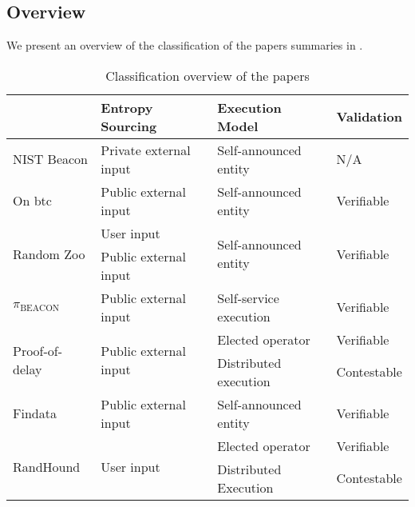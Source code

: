 \subsection{Overview}
\label{sub:overview}
We present an overview of the classification of the papers summaries in .

\begin{table}[htbp]
    \centering
    \begin{tabularx}{\textwidth}{Xlll}
                               & \textbf{Entropy Sourcing}              & \textbf{Execution Model}               & \textbf{Validation}         \\\midrule
NIST Beacon                    & Private external input                 & Self-announced entity                  & N/A                         \\[1.5em]
On btc                         & Public external input                  & Self-announced entity                  & Verifiable                  \\[1.5em]
\multirow{2}{*}{Random Zoo}    & User input                             & \multirow{2}{*}{Self-announced entity} & \multirow{2}{*}{Verifiable} \\
                               & Public external input                  &                                        &                             \\[1.5em]
$\pi_\text{BEACON}$                   & Public external input                  & Self-service execution                 & Verifiable                  \\[1.5em]
\multirow{2}{*}{Proof-of-delay}& \multirow{2}{*}{Public external input} & Elected operator                       & Verifiable                  \\
                               &                                        & Distributed execution                  & Contestable                 \\[1.5em]
Findata                        & Public external input                  & Self-announced entity                  & Verifiable                  \\[1.5em]
\multirow{2}{*}{RandHound}     & \multirow{2}{*}{User input}            & Elected operator                       & Verifiable                  \\
                               &                                        & Distributed Execution                  & Contestable\\\bottomrule
    \end{tabularx}
    \caption{Classification overview of the papers}\label{tab:paper_overview}
\end{table}

